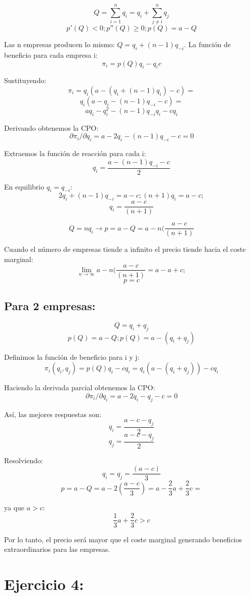 \documentclass{article}
\begin{document}
$$Q=\sum_{i=1}^nq_i=q_i+\sum_{j\neq i}^nq_j$$             
$$p'(Q)<0; p''(Q)\geq0; p(Q)=a-Q$$                                
         
Las n empresas producen lo mismo: $Q=q_i+(n-1)q_{-i}$.
                                                                                                                                                                                              La funci\'on de beneficio para cada empresa i:            
$$\pi_i=p(Q)q_i-q_ic$$

Sustituyendo:
$$\pi_i=q_i(a-(q_i+(n-1)q_i)-c)=$$
$$q_i(a-q_i-(n-1)q_{-i}-c)=$$
$$aq_i-q_i^2-(n-1)q_{-i}q_i-cq_i$$

Derivando obtenemos la CPO:
$$\partial \pi_i/\partial q_i= a-2q_i-(n-1)q_{-i}-c=0$$

Extraemos la funci\'on de reacci\'on para cada i:
$$q_i=\frac{a-(n-1)q_{-i}-c}{2}$$

En equilibrio $q_i=q_{-i}$:
$$2q_i+(n-1)q_{-i}=a-c; (n+1)q_i=a-c;$$
$$q_i=\frac{a-c}{(n+1)}$$

$$Q=nq_i \rightarrow p=a-Q=a-n(\frac{a-c}{(n+1)}$$

Cuando el n\'umero de empresas tiende a infinito el precio tiende hacia el coste marginal:
$$\lim_{n\rightarrow \infty}a-n(\frac{a-c}{(n+1)}=a-a+c;$$
$$p=c$$

\subsection{Para 2 empresas:}

$$Q=q_i+q_j$$
$$p(Q)=a-Q; p(Q)=a-(q_i+q_j)$$

Definimos la funci\'on de beneficio para i y j:
$$\pi_i(q_i,q_j)=p(Q)q_i-cq_i=q_i(a-(q_i+q_j))-cq_i$$

Haciendo la derivada parcial obtenemos la CPO:
$$\partial \pi_i/\partial q_i= a-2q_i-q_j-c=0$$

As\'i, las mejores respuestas son:
$$q_i=\frac{a-c-q_j}{2}$$
$$q_j=\frac{a-c-q_j}{2}$$

Resolviendo:
$$q_i=q_j=\frac{(a-c)}{3}$$
$$p=a-Q=a-2(\frac{a-c}{3})=a-\frac{2}{3}a+\frac{2}{3}c=$$

ya que $a>c$:
$$\frac{1}{3}a+\frac{2}{3}c>c$$

Por lo tanto, el precio ser\'a mayor que el coste marginal generando beneficios extraordinarios para las empresas.

\section{Ejercicio 4:}
\end{document}
